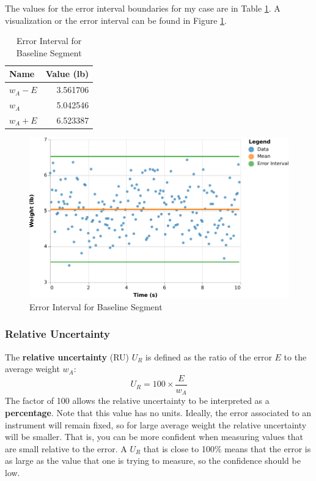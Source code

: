 The values for the error interval boundaries for my case are in Table \ref{table:00.baseline.interval}. A visualization or the error interval can be found in Figure \ref{figure:00.baseline.interval}.
\begin{table}
    \centering
	\begin{tabular}{|l|r|} \hline
		\textbf{Name} & \textbf{Value (lb)} \\
		\hline
		$w_{A} - E$ & 3.561706 \\
		$w_{A}$ & 5.042546 \\
		$w_{A} + E$ & 6.523387 \\
		\hline
	\end{tabular}
    \caption{Error Interval for Baseline Segment}
    \label{table:00.baseline.interval}
\end{table}
\begin{figure}
    \centering
    \includegraphics{chart/00-intro/baseline-error-interval.pdf}
    \caption{Error Interval for Baseline Segment}
    \label{figure:00.baseline.interval}
\end{figure}
\subsubsection{Relative Uncertainty}
The \textbf{relative uncertainty} (RU) $U_{R}$ is defined as the ratio of the error $E$ to the average weight $w_{A}$:
\begin{equation}
    U_{R} = 100 \times \frac{E}{w_{A}}
\end{equation}
The factor of 100 allows the relative uncertainty to be interpreted as a \textbf{percentage}. Note that this value has no units. Ideally, the error associated to an instrument will remain fixed, so for large average weight the relative uncertainty will be smaller. That is, you can be more confident when measuring values that are small relative to the error. A $U_{R}$ that is close to 100\% means that the error is as large as the value that one is trying to measure, so the confidence should be low.

